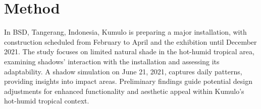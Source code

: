 \begin{minipage}[t][(\PaperHeight-\PaperTopMargin-\PaperBottomMargin
		-16pt%
		)\relax][t]{\linewidth}%
	\ChapterFrontmatter
	\section*{
	  Method
	 }
	
	\vfill
	In BSD, Tangerang, Indonesia, Kumulo is preparing a major installation, with construction scheduled from February to April and the exhibition until December 2021. The study focuses on limited natural shade in the hot-humid tropical area, examining shadows' interaction with the installation and assessing its adaptability. A shadow simulation on June 21, 2021, captures daily patterns, providing insights into impact areas. Preliminary findings guide potential design adjustments for enhanced functionality and aesthetic appeal within Kumulo's hot-humid tropical context.
	\vfill
	\begin{minipage}[t]{0.31\linewidth}%
	\end{minipage}
	\hfill
	\begin{minipage}[t]{0.31\linewidth}%
	\end{minipage}
	\hfill
	\begin{minipage}[t]{0.31\linewidth}%
	\end{minipage}
\end{minipage}
\EndTwoColumnLayout
\newpage
